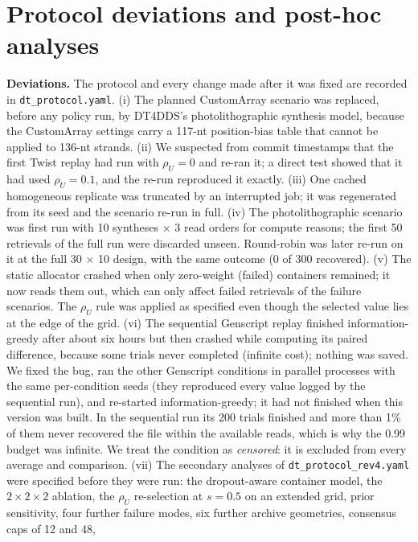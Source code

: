 \documentclass[acmsmall,screen]{acmart}
\begin{document}
\section{Protocol deviations and post-hoc analyses}\label{app:devfull}\label{app:dev}
\textbf{Deviations.}  The protocol and every change made after it was fixed are recorded in
\texttt{dt\_protocol.yaml}.  (i) The planned CustomArray scenario was replaced, before any policy run, by
DT4DDS's photolithographic synthesis model, because the CustomArray settings carry a 117-nt
position-bias table that cannot be applied to 136-nt strands.  (ii) We suspected from commit timestamps
that the first Twist replay had run with $\rho_U{=}0$ and re-ran it; a direct test showed that it had
used $\rho_U{=}0.1$, and the re-run reproduced it exactly.  (iii) One cached homogeneous replicate was
truncated by an interrupted job; it was regenerated from its seed and the scenario re-run in full.
(iv) The photolithographic scenario was first run with 10 syntheses $\times$ 3 read orders for compute
reasons; the first 50 retrievals of the full run were discarded unseen.  Round-robin was later re-run on
it at the full 30 $\times$ 10 design, with the same outcome (0 of 300 recovered).  (v) The static
allocator crashed when only zero-weight (failed) containers remained; it now reads them out, which can
only affect failed retrievals of the failure scenarios.  The $\rho_U$ rule was applied as specified even
though the selected value lies at the edge of the grid.  (vi) The sequential Genscript replay finished
information-greedy after about six hours but then crashed while computing its paired difference, because
some trials never completed (infinite cost); nothing was saved.  We fixed the bug, ran the other Genscript
conditions in parallel processes with the same per-condition seeds (they reproduced every value logged by
the sequential run), and re-started information-greedy; it had not finished when this version was built.
In the sequential run its 200 trials finished and more than 1\% of them never recovered the file within
the available reads, which is why the 0.99 budget was infinite.  We treat the condition as
\emph{censored}: it is excluded from every average and comparison.  (vii) The secondary analyses of
\texttt{dt\_protocol\_rev4.yaml} were specified before they were run: the dropout-aware container model,
the $2\times2\times2$ ablation, the $\rho_U$ re-selection at $s{=}0.5$ on an extended grid, prior
sensitivity, four further failure modes, six further archive geometries, consensus caps of 12 and 48,
\end{document}
